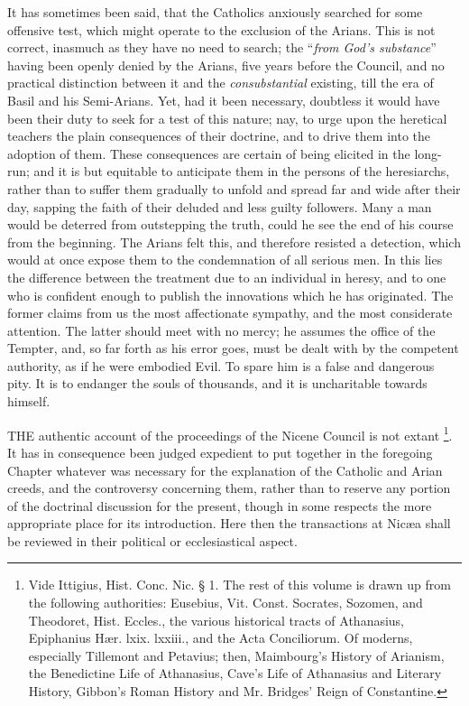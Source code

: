 It has sometimes been said, that the Catholics anxiously searched
for some offensive test, which might operate to the exclusion of the
Arians. This is not correct, inasmuch as they have no need to search;
the ``\emph{from God's substance}'' having been openly denied
by the Arians, five years before the Council, and no practical
distinction between it and the \emph{consubstantial} existing, till
the era of Basil and his Semi-Arians. Yet, had it been necessary,
doubtless it would have been their duty to seek for a test of this
nature; nay, to urge upon the heretical teachers the plain
consequences of their doctrine, and to drive them into the adoption of
them. These consequences are certain of being elicited in the
long-run; and it is but equitable to anticipate them in the persons of
the heresiarchs, rather than to suffer them gradually to unfold and
spread far and wide after their day, sapping the faith of their
deluded and less guilty followers. Many a man would be deterred from
outstepping the truth, could he see the end of his course from the
beginning. The Arians felt this, and therefore resisted a detection,
which would at once expose them to the condemnation of all serious
men. In this lies the difference between the treatment due to an
individual in heresy, and to one who is confident enough to publish
the innovations which he has originated. The former claims from us the
most affectionate sympathy, and the most considerate attention. The
latter should meet with no mercy; he assumes the office of the
Tempter, and, so far forth as his error goes, must be dealt with by
the competent authority, as if he were embodied Evil. To spare
him is a false and dangerous pity. It is to endanger the souls of
thousands, and it is uncharitable towards himself.



THE authentic account of the
proceedings of the Nicene Council is not extant \footnote{Vide Ittigius, Hist. Conc. Nic. § 1. The rest of this volume is
drawn up from the following authorities: Eusebius, Vit. Const.
Socrates, Sozomen, and Theodoret, Hist. Eccles., the various
historical tracts of Athanasius, Epiphanius Hær. lxix. lxxiii., and
the Acta Conciliorum. Of moderns, especially Tillemont and Petavius;
then, Maimbourg's History of Arianism, the Benedictine Life of
Athanasius, Cave's Life of Athanasius and Literary History, Gibbon's
Roman History and Mr. Bridges' Reign of Constantine.}. It has in consequence been judged expedient to put together in
the foregoing Chapter whatever was necessary for the explanation of
the Catholic and Arian creeds, and the controversy concerning them,
rather than to reserve any portion of the doctrinal discussion for the
present, though in some respects the more appropriate place for its
introduction. Here then the transactions at Nicæa shall be reviewed
in their political or ecclesiastical aspect.

